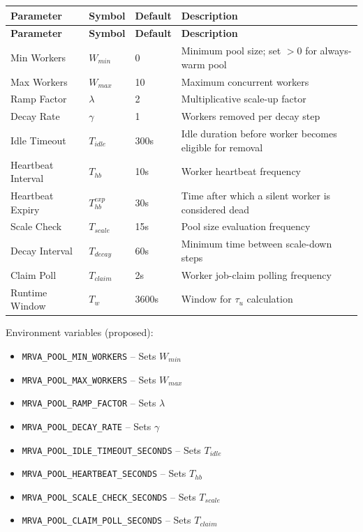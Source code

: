 \documentclass[11pt]{article}
\begin{document}
\begin{center}
\begin{longtable}{p{3.5cm}p{1.5cm}p{2cm}p{7cm}}
\toprule
\textbf{Parameter} & \textbf{Symbol} & \textbf{Default} & \textbf{Description} \\
\midrule
\endfirsthead

\toprule
\textbf{Parameter} & \textbf{Symbol} & \textbf{Default} & \textbf{Description} \\
\midrule
\endhead

\midrule
\endfoot

\bottomrule
\endlastfoot

Min Workers & $W_{min}$ & 0 & Minimum pool size; set $> 0$ for always-warm pool \\
Max Workers & $W_{max}$ & 10 & Maximum concurrent workers \\
Ramp Factor & $\lambda$ & 2 & Multiplicative scale-up factor \\
Decay Rate & $\gamma$ & 1 & Workers removed per decay step \\
Idle Timeout & $T_{idle}$ & 300s & Idle duration before worker becomes eligible for
  removal \\
Heartbeat Interval & $T_{hb}$ & 10s & Worker heartbeat frequency \\
Heartbeat Expiry & $T_{hb}^{exp}$ & 30s & Time after which a silent worker is
  considered dead \\
Scale Check & $T_{scale}$ & 15s & Pool size evaluation frequency \\
Decay Interval & $T_{decay}$ & 60s & Minimum time between scale-down steps \\
Claim Poll & $T_{claim}$ & 2s & Worker job-claim polling frequency \\
Runtime Window & $T_w$ & 3600s & Window for $\tau_u$ calculation \\
\end{longtable}
\end{center}

Environment variables (proposed):
\begin{itemize}
\item \texttt{MRVA\_POOL\_MIN\_WORKERS} -- Sets $W_{min}$
\item \texttt{MRVA\_POOL\_MAX\_WORKERS} -- Sets $W_{max}$
\item \texttt{MRVA\_POOL\_RAMP\_FACTOR} -- Sets $\lambda$
\item \texttt{MRVA\_POOL\_DECAY\_RATE} -- Sets $\gamma$
\item \texttt{MRVA\_POOL\_IDLE\_TIMEOUT\_SECONDS} -- Sets $T_{idle}$
\item \texttt{MRVA\_POOL\_HEARTBEAT\_SECONDS} -- Sets $T_{hb}$
\item \texttt{MRVA\_POOL\_SCALE\_CHECK\_SECONDS} -- Sets $T_{scale}$
\item \texttt{MRVA\_POOL\_CLAIM\_POLL\_SECONDS} -- Sets $T_{claim}$
\end{itemize}
\end{document}
